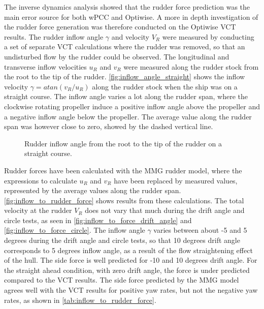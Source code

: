 The inverse dynamics analysis showed that the rudder force prediction was the main error source for both wPCC and Optiwise. A more in depth investigation of the rudder force generation was therefore conducted on the Optiwise VCT results.
The rudder inflow angle $\gamma$ and velocity $V_R$ were measured by conducting a set of separate VCT calculations where the rudder was removed, so that an undisturbed flow by the rudder could be observed. The longitudinal and transverse inflow velocities $u_R$ and $v_R$ were measured along the rudder stock from the root to the tip of the rudder. \autoref{fig:inflow_angle_straight} shows the inflow velocity $\gamma=atan(v_R/u_R)$ along the rudder stock when the ship was on a straight course. The inflow angle varies a lot along the rudder span, where the clockwise rotating propeller induce a positive inflow angle above the propeller and a negative inflow angle below the propeller. The average value along the rudder span was however close to zero, showed by the dashed vertical line.
\begin{figure}[h]
    \centering 
    
    \caption{Rudder inflow angle from the root to the tip of the rudder on a straight course.}
     \label{fig:inflow_angle_straight}
\end{figure}
Rudder forces have been calculated with the MMG rudder model, where the expressions to calculate $u_R$ and $v_R$ have been replaced by measured values, represented by the average values along the rudder span. 
\autoref{fig:inflow_to_rudder_force} shows results from these calculations. The total velocity at the rudder $V_R$ does not vary that much during the drift angle and circle tests, as seen in \autoref{fig:inflow_to_force_drift_angle} and \autoref{fig:inflow_to_force_circle}. The inflow angle $\gamma$ varies between about -5 and 5 degrees during the drift angle and circle tests, so that 10 degrees drift angle corresponds to 5 degrees inflow angle, as a result of the flow straightening effect of the hull. 
The side force is well predicted for -10 and 10 degrees drift angle. For the straight ahead condition, with zero drift angle, the force is under predicted compared to the VCT results. 
The side force predicted by the MMG model agrees well with the VCT results for positive yaw rates, but not the negative yaw rates, as shown in \autoref{tab:inflow_to_rudder_force}.   

